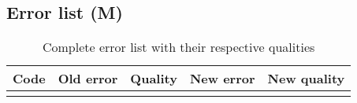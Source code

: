 \begin{landscape}
  \section*{Error list (M)}
  \label{app:error-list}

  \begin{longtable}{|p{4cm}|p{7cm}|p{2cm}|p{7cm}|p{2.5cm}|}\hline
      \textbf{Code} & \textbf{Old error} & \textbf{Quality} & \textbf{New error} & \textbf{New quality} \\\hline
    \endhead\small
    
    \caption{Complete error list with their respective qualities}
    \label{tab:error-list}
  \end{longtable}
\end{landscape}
